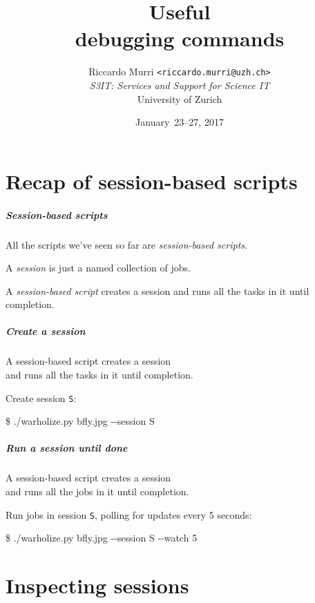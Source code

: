 \documentclass[english,serif,mathserif,xcolor=pdftex,dvipsnames,table]{beamer}
\title[Debugging commands]{%
  Useful \\ debugging commands
}
\author[R. Murri, S3IT UZH]{%
  Riccardo Murri \texttt{<riccardo.murri@uzh.ch>}
  \\[1ex]
  \emph{S3IT: Services and Support for Science IT}
  \\[1ex]
  University of Zurich
}
\date{January~23--27, 2017}
\begin{document}
\maketitle


\part{Recap of session-based scripts}


\begin{frame}
  \frametitle{Session-based scripts}

  All the scripts we've seen so far are \emph{session-based scripts}.

  \+ A \emph{session} is just a named collection of jobs.

  \+ A \emph{session-based script} creates a session and runs all the
  tasks in it until completion.
\end{frame}


\begin{frame}
  \frametitle{Create a session}

  A session-based script \alert{creates a session}
  \\
  and runs all the tasks in it until completion.

  \+ Create session \texttt{S}:
\begin{semiverbatim}
    \$ ./warholize.py bfly.jpg -{}-session S
\end{semiverbatim}
\end{frame}


\begin{frame}[fragile]
  \frametitle{Run a session until done}

  A session-based script creates a session
  \\
  and \alert<1>{runs all the jobs in it until completion.}

  \+ Run jobs in session \texttt{S},
  polling for updates every 5 seconds:
\begin{semiverbatim}\small
    \$ ./warholize.py bfly.jpg -{}-session S -{}-watch 5
\end{semiverbatim}

  \+ 
\end{frame}


\part{Inspecting sessions}
\end{document}
